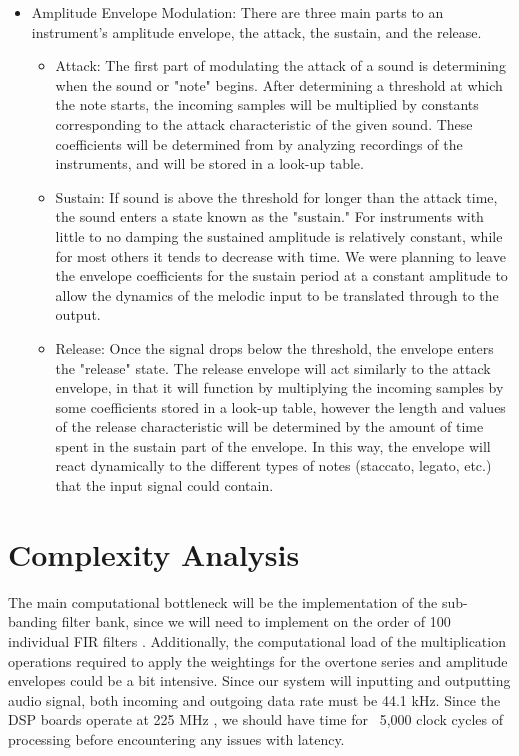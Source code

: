 \documentclass{article}
\begin{document}
\begin{itemize}
	\item Amplitude Envelope Modulation: There are three main parts to an instrument's amplitude envelope, the attack, the sustain, and the release.
    \begin{itemize}
    	\item Attack: The first part of modulating the attack of a sound is determining when the sound or "note" begins. After determining a threshold at which the note starts, the incoming samples will be multiplied by constants corresponding to the attack characteristic of the given sound. These coefficients will be determined from by analyzing recordings of the instruments, and will be stored in a look-up table.
        \item Sustain: If sound is above the threshold for longer than the attack time, the sound enters a state known as the "sustain." For instruments with little to no damping the sustained amplitude is relatively constant, while for most others it tends to decrease with time. We were planning to leave the envelope coefficients for the sustain period at a constant amplitude to allow the dynamics of the melodic input to be translated through to the output.
        \item Release: Once the signal drops below the threshold, the envelope enters the "release" state. The release envelope will act similarly to the attack envelope, in that it will function by multiplying the incoming samples by some coefficients stored in a look-up table, however the length and values of the release characteristic will be determined by the amount of time spent in the sustain part of the envelope. In this way, the envelope will react dynamically to the different types of notes (staccato, legato, etc.) that the input signal could contain.
    \end{itemize}
\end{itemize}

\section{Complexity Analysis}
The main computational bottleneck will be the implementation of the sub-banding filter bank, since we will need to implement on the order of 100 individual FIR filters
. Additionally, the computational load of the multiplication operations required to apply the weightings for the overtone series and amplitude envelopes could be a bit intensive.
Since our system will inputting and outputting audio signal, both incoming and outgoing data rate must be 44.1 kHz. Since the DSP boards operate at 225 MHz \cite{DSK6713manual}, we should have time for ~5,000 clock cycles of processing before encountering any issues with latency.
\end{document}
